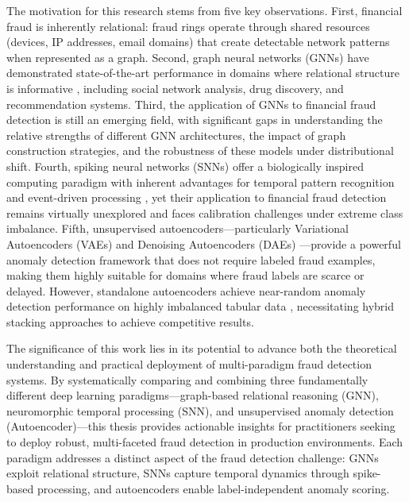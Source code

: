 The motivation for this research stems from five key observations. First, financial fraud is inherently relational: fraud rings operate through shared resources (devices, IP addresses, email domains) that create detectable network patterns when represented as a graph. Second, graph neural networks (GNNs) have demonstrated state-of-the-art performance in domains where relational structure is informative \cite{pourhabibi2022graph,cheng2024graph}, including social network analysis, drug discovery, and recommendation systems. Third, the application of GNNs to financial fraud detection is still an emerging field, with significant gaps in understanding the relative strengths of different GNN architectures, the impact of graph construction strategies, and the robustness of these models under distributional shift. Fourth, spiking neural networks (SNNs) offer a biologically inspired computing paradigm with inherent advantages for temporal pattern recognition and event-driven processing \cite{nasif2026reinforcement,ahmed2025bioinspired}, yet their application to financial fraud detection remains virtually unexplored and faces calibration challenges under extreme class imbalance. Fifth, unsupervised autoencoders---particularly Variational Autoencoders (VAEs) \cite{kingma2014auto} and Denoising Autoencoders (DAEs) \cite{vincent2010stacked}---provide a powerful anomaly detection framework that does not require labeled fraud examples, making them highly suitable for domains where fraud labels are scarce or delayed. However, standalone autoencoders achieve near-random anomaly detection performance on highly imbalanced tabular data \cite{dong2025enhanced,obushyni2025vae}, necessitating hybrid stacking approaches to achieve competitive results.

The significance of this work lies in its potential to advance both the theoretical understanding and practical deployment of multi-paradigm fraud detection systems. By systematically comparing and combining three fundamentally different deep learning paradigms---graph-based relational reasoning (GNN), neuromorphic temporal processing (SNN), and unsupervised anomaly detection (Autoencoder)---this thesis provides actionable insights for practitioners seeking to deploy robust, multi-faceted fraud detection in production environments. Each paradigm addresses a distinct aspect of the fraud detection challenge: GNNs exploit relational structure, SNNs capture temporal dynamics through spike-based processing, and autoencoders enable label-independent anomaly scoring.

